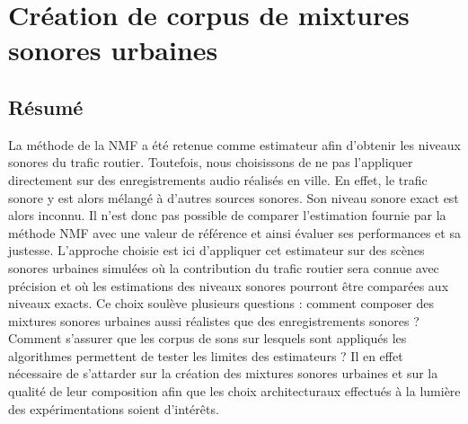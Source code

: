 \chapter{Création de corpus de mixtures sonores urbaines}
\label{chap:corpusSonore}

\section*{\centering Résumé}


\vspace{2cm}

La méthode de la NMF a été retenue comme estimateur afin d'obtenir les niveaux sonores du trafic routier. Toutefois, nous choisissons de ne pas l'appliquer directement sur des enregistrements audio réalisés en ville. En effet, le trafic sonore y est alors mélangé à d'autres sources sonores. Son niveau sonore exact est alors inconnu. Il n'est donc pas possible de comparer l'estimation fournie par la méthode NMF avec une valeur de référence et ainsi évaluer ses performances et sa justesse. L'approche choisie est ici d'appliquer cet estimateur sur des scènes sonores urbaines simulées où la contribution du trafic routier sera connue avec précision et où les estimations des niveaux sonores pourront être comparées aux niveaux exacts. Ce choix soulève plusieurs questions : comment composer des mixtures sonores urbaines aussi réalistes que des enregistrements sonores ? Comment s'assurer que les corpus de sons sur lesquels sont appliqués les algorithmes permettent de tester les limites des estimateurs ?
Il en effet nécessaire de s'attarder sur la création des mixtures sonores urbaines et sur la qualité de leur composition afin que les choix architecturaux effectués à la lumière des expérimentations soient d'intérêts.

